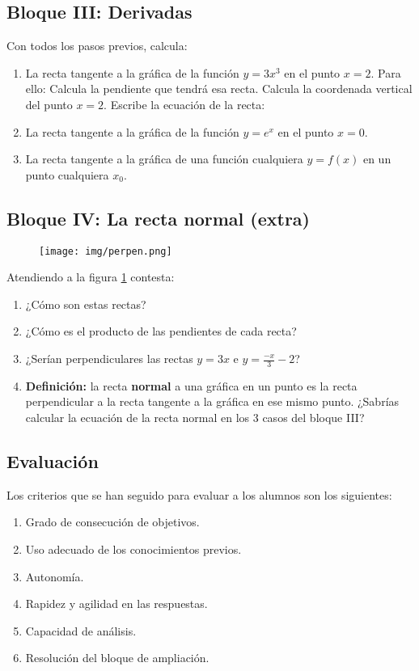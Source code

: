 \documentclass[palatino]{apuntesURJC}
\begin{document}
\subsection{Bloque III: Derivadas}

Con todos los pasos previos, calcula:

\begin{enumerate}
	\item La recta tangente a la gráfica de la función $y=3x^3$ en el punto $x=2$. Para ello:
	\subitem Calcula la pendiente que tendrá esa recta.
	\subitem Calcula la coordenada vertical del punto $x=2$.
	\subitem Escribe la ecuación de la recta:
	\item La recta tangente a la gráfica de la función $y=e^x$ en el punto $x=0$.
	\item La recta tangente a la gráfica de una función cualquiera $y=f(x)$ en un punto cualquiera $x_0$.
\end{enumerate}
\newpage
\subsection{Bloque IV: La recta normal (extra)}

\begin{figure}[hbtp]
\centering
\texttt{[image: img/perpen.png]}
\caption{}
\label{img:perpen}
\end{figure}


Atendiendo a la figura \ref{img:perpen} contesta:
\begin{enumerate}
	\item ¿Cómo son estas rectas?
	\item ¿Cómo es el producto de las pendientes de cada recta?
	\item ¿Serían perpendiculares las rectas $y=3x$ e $y=\frac{-x}{3}-2$?
	\item \textbf{Definición:} la recta \textbf{normal} a una gráfica en un punto es la recta perpendicular a la recta tangente a la gráfica en ese mismo punto.
	\subitem ¿Sabrías calcular la ecuación de la recta normal en los 3 casos del bloque III?
\end{enumerate}

\subsection{Evaluación}
Los criterios que se han seguido para evaluar a los alumnos son los siguientes:
\begin{enumerate}
	\item Grado de consecución de objetivos.
	\item Uso adecuado de los conocimientos previos.
	\item Autonomía.
	\item Rapidez y agilidad en las respuestas.
	\item Capacidad de análisis.
	\item Resolución del bloque de ampliación.
\end{enumerate}



\printindex
\end{document}
